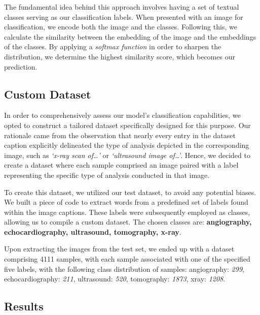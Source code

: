 \documentclass[10pt,twocolumn,letterpaper]{article}
\begin{document}
The fundamental idea behind this approach involves having a set of textual classes serving as our classification labels. When presented with an image for classification, we encode both the image and the classes. Following this, we calculate the similarity between the embedding of the image and the embeddings of the classes. By applying a \textit{softmax function} in order to sharpen the distribution, we determine the highest similarity score, which becomes our prediction.

\subsection{Custom Dataset}
In order to comprehensively assess our model's classification capabilities, we opted to construct a tailored dataset specifically designed for this purpose. Our rationale came from the observation that nearly every entry in the dataset caption explicitly delineated the type of analysis depicted in the corresponding image, such as \textit{`x-ray scan of\ldots'} or \textit{ `ultrasound image of\ldots}'. Hence, we decided to create a dataset where each sample comprised an image paired with a label representing the specific type of analysis conducted in that image.

To create this dataset, we utilized our test dataset, to avoid any potential biases. We built a piece of code to extract words from a predefined set of labels found within the image captions. These labels were subsequently employed as classes, allowing us to compile a custom dataset. The chosen classes are: \textbf{angiography, echocardiography, ultrasound, tomography, x-ray}.

Upon extracting the images from the test set, we ended up with a dataset comprising 4111 samples, with each sample associated with one of the specified five labels, with the following class distribution of samples: angiography: \textit{299}, echocardiography: \textit{211}, ultrasound: \textit{520}, tomography: \textit{1873}, xray: \textit{1208}.

\subsection{Results}
\end{document}
